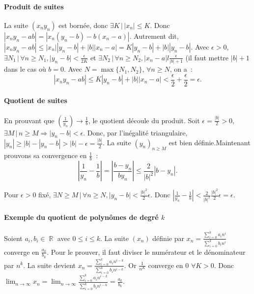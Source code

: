 \documentclass{article}
\DeclareMathOperator{\R}{\mathbb R}
\theoremstyle{definition}
\theoremstyle{remark}
\begin{document}
			\paragraph{Produit de suites} La suite $(x_ny_n)$ est bornée, donc $\exists K \, | \, |x_n| \leq K$. Donc $|x_ny_n - ab| = |x_n(y_n - b) - b(x_n - a)|$.
			Autrement dit, $|x_ny_n - ab| \leq |x_n||y_n - b| + |b||x_n - a| = K|y_n - b| + |b||y_n - b|$.
			Avec $\epsilon > 0$, $\exists N_1 \, | \, \forall n \geq N_1, |y_n - b| < \frac {\epsilon}{2K}$ et $\exists N_2 \, | \, \forall n \geq N_2, |x_n - a| l \frac {\epsilon}{|b| + 1}$
			(il faut mettre $|b| + 1$ dans le cas où $b = 0$. Avec $N = \max \{N_1, N_2\}$, $\forall n \geq N$, on a~:
			\[|x_ny_n - ab| \leq K|y_n - b| + |b||x_n - a| < \frac \epsilon2 + \frac \epsilon2 = \epsilon.\]

			\paragraph{Quotient de suites} En prouvant que $(\frac {1}{y_n}) \to \frac 1b$, le quotient découle du produit.
			Soit $\epsilon = \frac {|b|}{2} > 0$, $\exists M \, | \, n \geq M \Rightarrow |y_n - b| < \epsilon$. Donc, par l'inégalité triangulaire,
			$|y_n| \geq |b| - |y_n - b| > |b| - \epsilon = \frac {|b|}{2}$. La suite $(y_n)_{n \geq M}$ est bien définie.Maintenant prouvons sa
			convergence en $\frac 1b$~:
			\[\left|\frac {1}{y_n} - \frac 1b\right| = \left|\frac {b - y_n}{by_n}\right| \leq \frac {2}{|b|^2}|b - y_n|.\]

			Pour $\epsilon > 0$ fixé, $\exists N \geq M \, | \, \forall n \geq N, |y_n - b| < \frac {|b|^2}{2}\epsilon$.
			Donc $|\frac {1}{y_n} - \frac 1b| < \frac {2}{|b|^2}\frac {|b|^2}{2}\epsilon = \epsilon$.

			\paragraph{Exemple du quotient de polynômes de degré $k$} Soient $a_i, b_i \in \R$ avec $0 \leq i \leq k$. La suite $(x_n)$ définie par
			$x_n = \frac {\sum_{i = 0}^ka_in^i}{\sum_{i = 0}^kb_in^i}$ converge en $\frac {a_k}{b_k}$. Pour le prouver, il faut diviser le numérateur
			et le dénominateur par $n^k$. La suite devient $x_n = \frac {\sum_{i = 0}^ka_in^{i-k}}{\sum_{i = 0}^kb_in^{i-k}}$. Or $\frac {1}{n^K}$
			converge en 0 $\forall K > 0$. Donc $\lim_{n\to\infty}x_n = \lim_{n\to\infty}\frac {\sum_{i = 0}^ka_in^{i-k}}{\sum_{i = 0}^kb_in^{i-k}} = \frac {a_k}{b_k}$.
\end{document}
